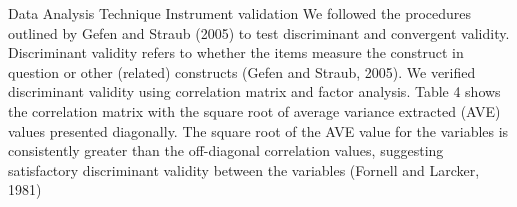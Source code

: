 Data Analysis Technique
Instrument validation
We followed the procedures outlined by Gefen and Straub (2005) to test discriminant and convergent validity. Discriminant validity refers to whether the items measure the construct in question or other (related) constructs (Gefen and Straub, 2005). We verified discriminant validity using correlation matrix and factor analysis. Table 4 shows the correlation matrix with the square root of average variance extracted (AVE) values presented diagonally. The square root of the AVE value for the variables is consistently greater than the off-diagonal correlation values, suggesting satisfactory discriminant validity between the variables (Fornell and Larcker, 1981)





